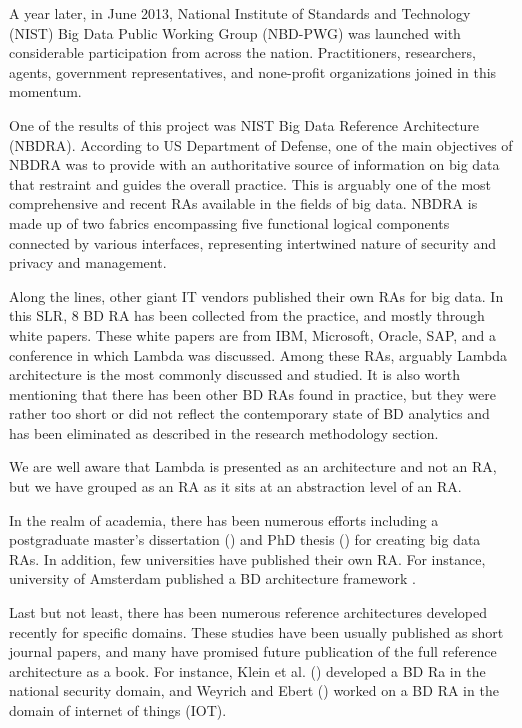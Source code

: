 \documentclass[review]{elsarticle}
\begin{document}
A year later, in June 2013, National Institute of Standards and Technology (NIST) Big Data Public Working Group (NBD-PWG) was launched with considerable participation from across the nation. Practitioners, researchers, agents, government representatives, and none-profit organizations joined in this momentum.

One of the results of this project was NIST Big Data Reference Architecture (NBDRA). According to US Department of Defense, one of the main objectives of NBDRA was to provide with an authoritative source of information on big data that restraint and guides the overall practice. This is arguably one of the most comprehensive and recent RAs available in the fields of big data. NBDRA is made up of two fabrics encompassing five functional logical components connected by various interfaces, representing intertwined nature of security and privacy and management.

Along the lines, other giant IT vendors published their own RAs for big data. In this SLR, 8 BD RA has been collected from the practice, and mostly through white papers. These white papers are from IBM, Microsoft, Oracle, SAP, and a conference in which Lambda was discussed. Among these RAs, arguably Lambda architecture is the most commonly discussed and studied. It is also worth mentioning that there has been other BD RAs found in practice, but they were rather too short or did not reflect the contemporary state of BD analytics and has been eliminated as described in the research methodology section.

We are well aware that Lambda is presented as an architecture and not an RA, but we have grouped as an RA as it sits at an abstraction level of an RA.

In the realm of academia, there has been numerous efforts including a postgraduate master’s dissertation (\cite{Maier}) and PhD thesis (\cite{suthakar2017scalable}) for creating big data RAs. In addition, few universities have published their own RA. For instance, university of Amsterdam published a BD architecture framework \cite{framework2015draft}. 

Last but not least, there has been numerous reference architectures developed recently for specific domains. These studies have been usually published as short journal papers, and many have promised future publication of the full reference architecture as a book. For instance, Klein et al. (\cite{Klein}) developed a BD Ra in the national security domain, and Weyrich and Ebert (\cite{weyrich2015reference}) worked on a BD RA in the domain of internet of things (IOT). 
\end{document}
